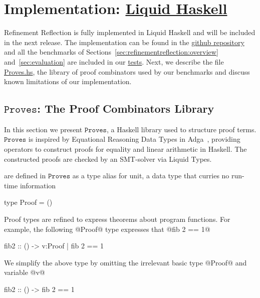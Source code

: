 \section{Implementation: \href{https://github.com/ucsd-progsys/liquidhaskell/tree/popl17}{Liquid Haskell}}

Refinement Reflection is fully implemented in 
Liquid Haskell and will be included in the next release. 
%
The implementation can be found in the
% 
\href{https://github.com/ucsd-progsys/liquidhaskell/tree/popl17}{github repository}
%
and all the benchmarks of Sections~\ref{sec:refinementreflection:overview} and~\ref{sec:evaluation}
are included in our 
%
\href{https://github.com/ucsd-progsys/liquidhaskell/tree/popl17/benchmarks/popl17/pos}{tests}. 
%
Next, we describe the file 
%
\href{https://github.com/ucsd-progsys/liquidhaskell/blob/popl17/benchmarks/popl17/pos/Proves.hs}{Proves.hs}, 
%
the library of proof combinators used by our benchmarks
and discuss known limitations of our implementation. 


\renewcommand\libname{\ensuremath{\texttt{Proves}}\xspace}

\subsection{\libname: The Proof Combinators Library}
\label{subsec:library}

In this section we present \libname,
a Haskell library used to structure proof terms.
%
\libname is inspired by Equational Reasoning Data Types
in Adga~\citep{agdaequational}, providing operators to
construct proofs for equality and linear arithmetic in Haskell.
%
The constructed proofs are checked by an SMT-solver via Liquid Types.

 are defined in \libname as a type alias for unit,
a data type that curries no run-time information
%
\begin{code}
  type Proof = ()
\end{code}
%
Proof types are refined to express theorems about program functions.
%
For example, the following @Proof@ type expresses that
@fib 2 == 1@
%
\begin{code}
  fib2 :: () -> {v:Proof | fib 2 == 1}
\end{code}
%
We simplify the above type by omitting the irrelevant
basic type @Proof@ and variable @v@
%
\begin{code}
  fib2 :: () -> { fib 2 == 1 }
\end{code}
%

